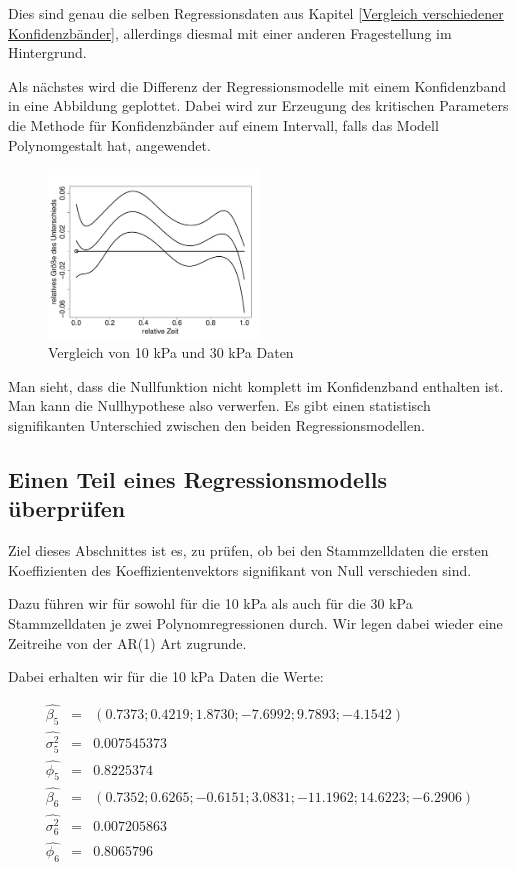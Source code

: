 \documentclass[12pt,a4paper]{article}
\theoremstyle{definition}
\theoremstyle{definition}
\theoremstyle{definition}
\theoremstyle{definition}
\begin{document}
Dies sind genau die selben Regressionsdaten aus Kapitel \ref{Vergleich verschiedener Konfidenzbänder}, allerdings diesmal mit einer anderen Fragestellung im Hintergrund.

Als nächstes wird die Differenz der Regressionsmodelle mit einem Konfidenzband in eine Abbildung geplottet. Dabei wird zur Erzeugung des kritischen Parameters die Methode für Konfidenzbänder auf einem Intervall, falls das Modell Polynomgestalt hat, angewendet.

\begin{figure}[H] 
  \centering
     \includegraphics[width=0.5\textwidth]{Vergleich-10vs30kPa-poly5-KB}
  \caption{Vergleich von 10 kPa und 30 kPa Daten}
  \label{fig:10}
\end{figure}

Man sieht, dass die Nullfunktion nicht komplett im Konfidenzband enthalten ist. Man kann die Nullhypothese also verwerfen. Es gibt einen statistisch signifikanten Unterschied zwischen den beiden Regressionsmodellen.


\subsection{Einen Teil eines Regressionsmodells überprüfen}
Ziel dieses Abschnittes ist es, zu prüfen, ob bei den Stammzelldaten die ersten Koeffizienten des Koeffizientenvektors signifikant von Null verschieden sind.

Dazu führen wir für sowohl für die 10 kPa als auch für die 30 kPa Stammzelldaten je zwei Polynomregressionen durch. Wir legen dabei wieder eine Zeitreihe von der AR(1) Art zugrunde.

Dabei erhalten wir für die 10 kPa Daten die Werte:

\begin{eqnarray*}
\hat{\beta_{5}} &=&  (0.7373 ; 0.4219 ; 1.8730 ; -7.6992 ; 9.7893 ; -4.1542)  \\
\hat{\sigma_{5}^2} &=& 0.007545373 \\
\hat{\phi_{5}} &=& 0.8225374 \\
\hat{\beta_{6}} &=& (0.7352 ; 0.6265 ; -0.6151 ; 3.0831 ; -11.1962 ; 14.6223 ; -6.2906)  \\
\hat{\sigma_{6}^2} &=& 0.007205863 \\
\hat{\phi_{6}} &=& 0.8065796
\end{eqnarray*}
\end{document}
